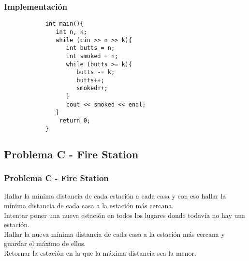 \documentclass{beamer}
\begin{document}
	\begin{frame}[fragile]
		\frametitle{Implementación}
		\begin{lstlisting}
			int main(){
			   int n, k;
			   while (cin >> n >> k){
			      int butts = n;
			      int smoked = n;
			      while (butts >= k){
			         butts -= k;
			         butts++;
			         smoked++;
			      }
			      cout << smoked << endl;
			   }
			    return 0;
			}
		\end{lstlisting}
	\end{frame}
	
	\subsection{Problema C - Fire Station}
	\begin{frame}
		\frametitle{Problema C - Fire Station}
		Hallar la mínima distancia de cada estación a cada casa y con eso hallar la mínima distancia de cada casa a la estación más cercana.\\
		Intentar poner una nueva estación en todos los lugares donde todavía no hay una estación.\\
		Hallar la nueva mínima distancia de cada casa a la estación más cercana y guardar el máximo de ellos.\\
		Retornar la estación en la que la máxima distancia sea la menor.
	\end{frame}
	
\end{document}
